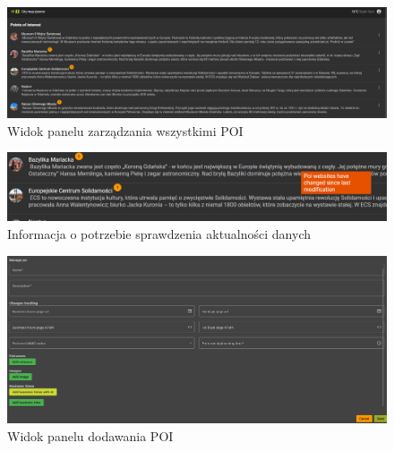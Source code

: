 \begin{figure}[H]
    \centering
    \includegraphics[width=1\textwidth]{attachments/poi-manage}
    \caption{Widok panelu zarządzania wszystkimi POI}
    \label{fig:poi-manage}
\end{figure}

\begin{figure}[H]
    \centering
    \includegraphics[width=1\textwidth]{attachments/poi-notify}
    \caption{Informacja o potrzebie sprawdzenia aktualności danych}
    \label{fig:ManageNofify}
\end{figure}

\begin{figure}[H]
    \centering
    \includegraphics[width=1\textwidth]{attachments/addpoi}
    \caption{Widok panelu dodawania POI}
    \label{fig:ManageNofify}
\end{figure}